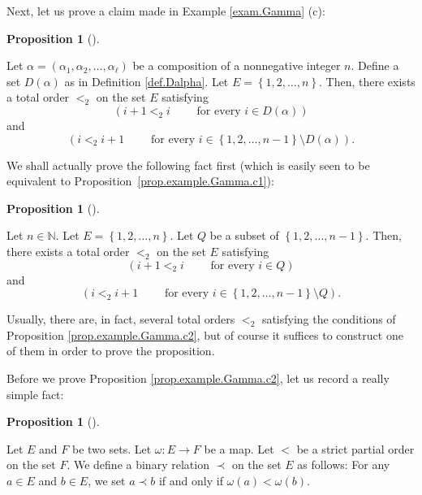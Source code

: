 \documentclass[numbers=enddot,12pt,final,onecolumn,notitlepage,abstracton]{scrartcl}
\theoremstyle{definition}
\newtheorem{prop}[theo]{Proposition}
\newenvironment{proposition}[1][]
{\begin{prop}[#1]\begin{leftbar}}
{\end{leftbar}\end{prop}}
\newenvironment{verlong}{}{}
\begin{document}
\begin{verlong}
\begin{footnotesize}
Next, let us prove a claim made in Example \ref{exam.Gamma} (c):

\begin{proposition}
\label{prop.example.Gamma.c1}Let $\alpha=\left(  \alpha_{1},\alpha_{2}%
,\ldots,\alpha_{\ell}\right)  $ be a composition of a nonnegative integer $n$.
Define a set $D\left(  \alpha\right)  $ as in Definition \ref{def.Dalpha}. Let
$E=\left\{  1,2,\ldots,n\right\}  $. Then, there exists a total order $<_{2}$
on the set $E$ satisfying%
\begin{equation}
\left(  i+1<_{2}i\qquad\text{ for every }i\in D\left(  \alpha\right)  \right)
\label{eq.prop.example.Gamma.c1.cond1}%
\end{equation}
and
\begin{equation}
\left(  i<_{2}i+1\qquad\text{ for every }i\in\left\{  1,2,\ldots,n-1\right\}
\setminus D\left(  \alpha\right)  \right)  .
\label{eq.prop.example.Gamma.c1.cond2}%
\end{equation}

\end{proposition}

We shall actually prove the following fact first (which is easily seen to be
equivalent to Proposition~\ref{prop.example.Gamma.c1}):

\begin{proposition}
\label{prop.example.Gamma.c2}Let $n\in\mathbb{N}$. Let $E=\left\{
1,2,\ldots,n\right\}  $. Let $Q$ be a subset of $\left\{  1,2,\ldots
,n-1\right\}  $. Then, there exists a total order $<_{2}$ on the set $E$
satisfying%
\begin{equation}
\left(  i+1<_{2}i\qquad\text{ for every }i\in Q\right)
\label{eq.prop.example.Gamma.c2.cond1}%
\end{equation}
and
\begin{equation}
\left(  i<_{2}i+1\qquad\text{ for every }i\in\left\{  1,2,\ldots,n-1\right\}
\setminus Q\right)  . \label{eq.prop.example.Gamma.c2.cond2}%
\end{equation}

\end{proposition}

Usually, there are, in fact, several total orders $<_{2}$ satisfying the
conditions of Proposition \ref{prop.example.Gamma.c2}, but of course it
suffices to construct one of them in order to prove the proposition.

Before we prove Proposition \ref{prop.example.Gamma.c2}, let us record a
really simple fact:

\begin{proposition}
\label{prop.order.pullback}Let $E$ and $F$ be two sets. Let $\omega
:E\rightarrow F$ be a map. Let $<$ be a strict partial order on the set $F$.
We define a binary relation $\prec$ on the set $E$ as follows: For any $a\in
E$ and $b\in E$, we set $a\prec b$ if and only if $\omega\left(  a\right)
<\omega\left(  b\right)  $.


\end{proposition}
\end{footnotesize}
\end{verlong}
\end{document}
